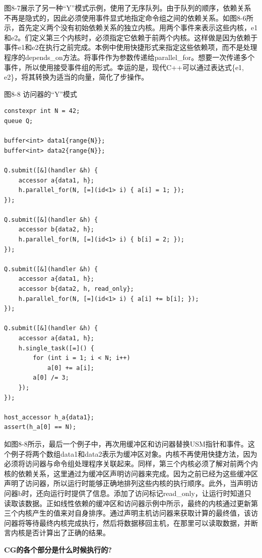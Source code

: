 图8-7展示了另一种“Y”模式示例，使用了无序队列。由于队列的顺序，依赖关系不再是隐式的，因此必须使用事件显式地指定命令组之间的依赖关系。如图8-6所示，首先定义两个没有初始依赖关系的独立内核。用两个事件来表示这些内核，e1和e2。们定义第三个内核时，必须指定它依赖于前两个内核。这样做是因为依赖于事件e1和e2在执行之前完成。本例中使用快捷形式来指定这些依赖项，而不是处理程序的depends\_on方法。将事件作为参数传递给parallel\_for。想要一次传递多个事件，所以使用接受事件组的形式。幸运的是，现代C++可以通过表达式\{e1, e2\}，将其转换为适当的向量，简化了步操作。\par

\hspace*{\fill} \par %
图8-8 访问器的“Y”模式
\begin{lstlisting}[caption={}]
constexpr int N = 42;
queue Q;

buffer<int> data1{range{N}};
buffer<int> data2{range{N}};

Q.submit([&](handler &h) {
	accessor a{data1, h};
	h.parallel_for(N, [=](id<1> i) { a[i] = 1; });
});

Q.submit([&](handler &h) {
	accessor b{data2, h};
	h.parallel_for(N, [=](id<1> i) { b[i] = 2; });
});

Q.submit([&](handler &h) {
	accessor a{data1, h};
	accessor b{data2, h, read_only};
	h.parallel_for(N, [=](id<1> i) { a[i] += b[i]; });
});

Q.submit([&](handler &h) {
	accessor a{data1, h};
	h.single_task([=]() {
		for (int i = 1; i < N; i++)
			a[0] += a[i];
		a[0] /= 3;
	});
});

host_accessor h_a{data1};
assert(h_a[0] == N);
\end{lstlisting}

如图8-8所示，最后一个例子中，再次用缓冲区和访问器替换USM指针和事件。这个例子将两个数组data1和data2表示为缓冲区对象。内核不再使用快捷方法，因为必须将访问器与命令组处理程序关联起来。同样，第三个内核必须了解对前两个内核的依赖关系，这里通过为缓冲区声明访问器来完成。因为之前已经为这些缓冲区声明了访问器，所以运行时能够正确地排列这些内核的执行顺序。此外，当声明访问器b时，还向运行时提供了信息。添加了访问标记read\_only，让运行时知道只读取该数据。正如线性依赖的缓冲区和访问器示例中所示，最终的内核通过更新第三个内核产生的值来对自身排序。通过声明主机访问器来获取计算的最终值，该访问器将等待最终内核完成执行，然后将数据移回主机，在那里可以读取数据，并断言内核是否计算出了正确的结果。\par 

\hspace*{\fill} \par %
\textbf{CG的各个部分是什么时候执行的?}

